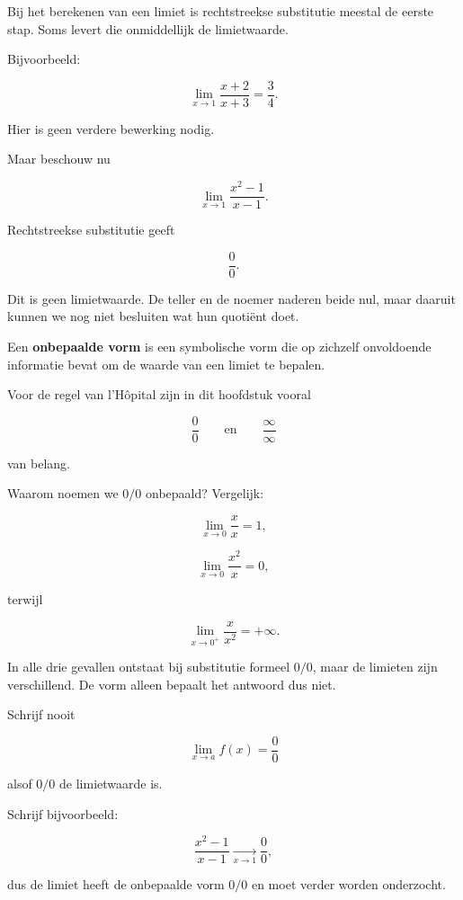 \documentclass{ximera}
\begin{document}


Bij het berekenen van een limiet is rechtstreekse substitutie meestal
de eerste stap. Soms levert die onmiddellijk de limietwaarde.

Bijvoorbeeld:

\[\lim_{x\to1}\frac{x+2}{x+3}=\frac34.\]

Hier is geen verdere bewerking nodig.

Maar beschouw nu

\[\lim_{x\to1}\frac{x^2-1}{x-1}.\]

Rechtstreekse substitutie geeft

\[\frac00.\]

Dit is geen limietwaarde. De teller en de noemer naderen beide nul, maar
daaruit kunnen we nog niet besluiten wat hun quotiënt doet.

\begin{definitie}
Een \textbf{onbepaalde vorm} is een symbolische vorm die op zichzelf
onvoldoende informatie bevat om de waarde van een limiet te bepalen.

Voor de regel van l'Hôpital zijn in dit hoofdstuk vooral

\[\boxed{\frac00 \qquad\text{en}\qquad \frac{\infty}{\infty}}\]

van belang.
\end{definitie}

Waarom noemen we \(0/0\) onbepaald? Vergelijk:

\[\lim_{x\to0}\frac{x}{x}=1,\]

\[\lim_{x\to0}\frac{x^2}{x}=0,\]

terwijl

\[\lim_{x\to0^+}\frac{x}{x^2}=+\infty.\]

In alle drie gevallen ontstaat bij substitutie formeel \(0/0\), maar de
limieten zijn verschillend. De vorm alleen bepaalt het antwoord dus niet.

\begin{opmerking}
Schrijf nooit

\[\lim_{x\to a}f(x)=\frac00\]

alsof \(0/0\) de limietwaarde is.

Schrijf bijvoorbeeld:

\[
\frac{x^2-1}{x-1}\xrightarrow[x\to1]{}\frac00,
\]

dus de limiet heeft de onbepaalde vorm \(0/0\) en moet verder worden
onderzocht.
\end{opmerking}
\end{document}
